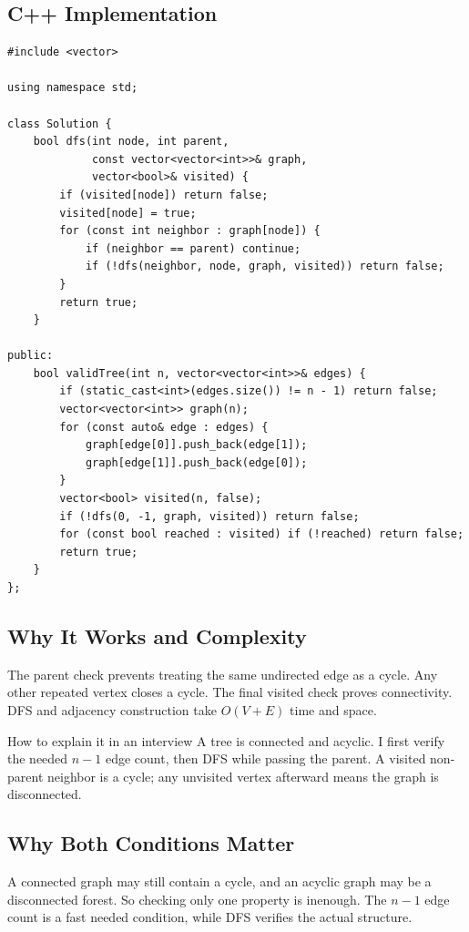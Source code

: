 \subsection{C++ Implementation}
\begin{lstlisting}[style=compactcode,caption={Complete C++ solution: Graph Valid Tree}]
#include <vector>

using namespace std;

class Solution {
    bool dfs(int node, int parent,
             const vector<vector<int>>& graph,
             vector<bool>& visited) {
        if (visited[node]) return false;
        visited[node] = true;
        for (const int neighbor : graph[node]) {
            if (neighbor == parent) continue;
            if (!dfs(neighbor, node, graph, visited)) return false;
        }
        return true;
    }

public:
    bool validTree(int n, vector<vector<int>>& edges) {
        if (static_cast<int>(edges.size()) != n - 1) return false;
        vector<vector<int>> graph(n);
        for (const auto& edge : edges) {
            graph[edge[0]].push_back(edge[1]);
            graph[edge[1]].push_back(edge[0]);
        }
        vector<bool> visited(n, false);
        if (!dfs(0, -1, graph, visited)) return false;
        for (const bool reached : visited) if (!reached) return false;
        return true;
    }
};
\end{lstlisting}

\subsection{Why It Works and Complexity}
The parent check prevents treating the same undirected edge as a cycle. Any
other repeated vertex closes a cycle. The final visited check proves
connectivity. DFS and adjacency construction take \(O(V+E)\) time and space.

\begin{revisionbox}{How to explain it in an interview}
A tree is connected and acyclic. I first verify the needed \(n-1\) edge
count, then DFS while passing the parent. A visited non-parent neighbor is a
cycle; any unvisited vertex afterward means the graph is disconnected.
\end{revisionbox}

\subsection{Why Both Conditions Matter}
A connected graph may still contain a cycle, and an acyclic graph may be a
disconnected forest. So checking only one property is inenough.
The \(n-1\) edge count is a fast needed condition, while DFS verifies the
actual structure.

